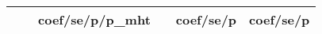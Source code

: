 \begin{longtable}{llcccccccccc}
& & \multicolumn{3}{c}{coef/se/p/p_{mht}} & & \multicolumn{3}{c}{coef/se/p} & \multicolumn{3}{c}{coef/se/p} \\ \hline                                                                                                                                                                                                                                                                                                                                                                                                                                                                                                                                                                                                                                                                                                                                                                                             
\endfirsthead                                                                                                                                                                                                                                                                                                                                                                                                                                                                                                                                                                                                                                                                                                                                                                                                                                                                                                     
                                                                                                                                                                                                                                                                                                                                                                                                                                                                                                                                                                                                                                                                                                                                                                                                                                                                                                                  

\end{longtable}
